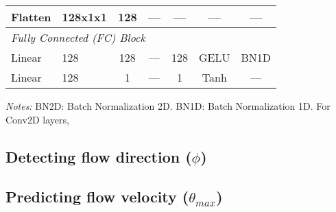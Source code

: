 \documentclass[12pt]{elsarticle}
\begin{document}
\begin{table}[!htbp]
{\begin{tabular}{llccccc}
        Flatten                   & 128x1x1             & 128                 & ---     & ---           & ---  & ---       \\
        \midrule
        \multicolumn{6}{l}{\textit{Fully Connected (FC) Block}} \\
        Linear                    & 128                 & 128                 & ---     & 128           & GELU    & BN1D   \\
        Linear                    & 128                 & 1                   & ---     & 1             & Tanh  & ---      \\
        \bottomrule
    \end{tabular}
    } %
    \par\medskip\footnotesize %
    \textit{Notes:} BN2D: Batch Normalization 2D. BN1D: Batch Normalization 1D.
    For Conv2D layers, 
\end{table}

\subsection{Detecting flow direction ($\phi$)}


\subsection{Predicting flow velocity ($\theta_{max}$)}



\end{document}
